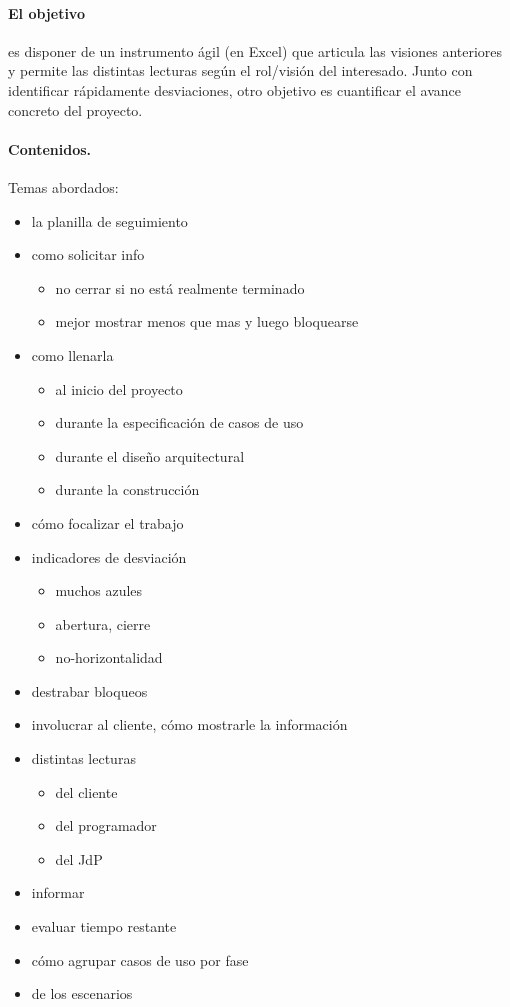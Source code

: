\documentclass[11pt]{article}
\begin{document}
\paragraph{El objetivo} es disponer de un instrumento \'agil (en Excel) que articula las visiones anteriores y permite las distintas lecturas seg\'un el rol/visi\'on del interesado. Junto con identificar r\'apidamente desviaciones, otro objetivo es cuantificar el avance concreto del proyecto.

\paragraph{Contenidos.}
Temas abordados:
\begin{itemize}
\item la planilla de seguimiento
\item como solicitar info
      \begin{itemize}
\item     no cerrar si no est\'a realmente terminado
\item     mejor mostrar menos que mas y luego bloquearse
      \end{itemize}
\item como llenarla
      \begin{itemize}
\item     al inicio del proyecto
\item     durante la especificaci\'on de casos de uso
\item     durante el dise\~no arquitectural
\item     durante la construcci\'on
      \end{itemize}
\item c\'omo focalizar el trabajo
\item indicadores de desviaci\'on
      \begin{itemize}
\item     muchos azules
\item     abertura, cierre
\item     no-horizontalidad
      \end{itemize}
\item destrabar bloqueos
\item involucrar al cliente, c\'omo mostrarle la informaci\'on
\item distintas lecturas
      \begin{itemize}
\item     del cliente
\item     del programador
\item     del JdP
      \end{itemize}
\item informar %
\item evaluar tiempo restante
\item c\'omo agrupar casos de uso por fase
\item de los escenarios
\end{itemize}
\end{document}
